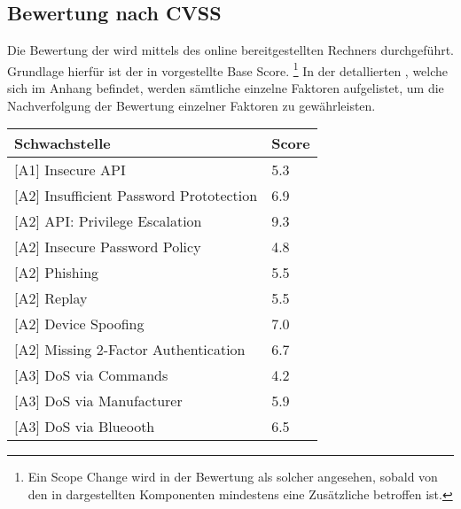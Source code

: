 \subsection{Bewertung nach CVSS}
\label{sec:analysis_cvss}
    Die Bewertung der  wird mittels des online bereitgestellten Rechners\cite{CvssCalc} durchgeführt.
	Grundlage hierfür ist der in  vorgestellte Base Score.
	\footnote{Ein Scope Change wird in der Bewertung als solcher angesehen, sobald von den in  dargestellten Komponenten mindestens eine Zusätzliche betroffen ist.}
	In der detallierten , welche sich im Anhang befindet, werden sämtliche einzelne Faktoren aufgelistet, um die Nachverfolgung der Bewertung einzelner Faktoren zu gewährleisten.

    \begin{table}[H]
        \centering
        \sffamily
        \begin{tabular}{|l|l|}
        \hline
\textbf{Schwachstelle}                      & \textbf{Score} \\ \hline
\rowcolor{light-gray}
{[}A1{]} Insecure API                       & \cellcolor{orange}5.3            \\ \hline
{[}A2{]} Insufficient Password Prototection & \cellcolor{orange}6.9            \\ \hline
\rowcolor{light-gray}
{[}A2{]} API: Privilege Escalation          & \cellcolor{red}9.3            \\ \hline
{[}A2{]} Insecure Password Policy           & \cellcolor{orange}4.8            \\ \hline
\rowcolor{light-gray}
{[}A2{]} Phishing                           & \cellcolor{orange}5.5            \\ \hline
{[}A2{]} Replay                             & \cellcolor{orange}5.5            \\ \hline
\rowcolor{light-gray}
{[}A2{]} Device Spoofing                    & \cellcolor{redorange}7.0            \\ \hline
{[}A2{]} Missing 2-Factor Authentication    & \cellcolor{orange}6.7            \\ \hline
\rowcolor{light-gray}
{[}A3{]} DoS via Commands                   & \cellcolor{orange}4.2            \\ \hline
{[}A3{]} DoS via Manufacturer               & \cellcolor{orange}5.9            \\ \hline
\rowcolor{light-gray}
{[}A3{]} DoS via Blueooth                   & \cellcolor{orange}6.5            \\ \hline

\end{tabular}
\end{table}
